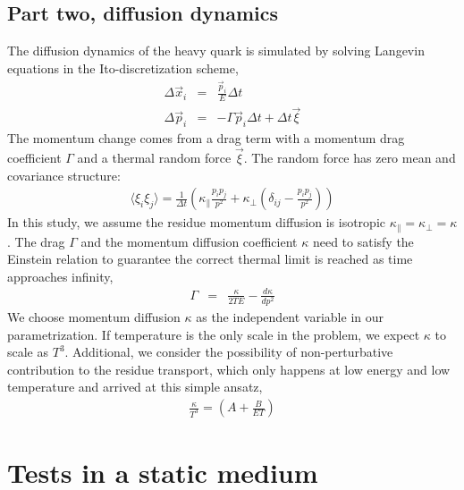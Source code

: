\documentclass[aps, prc, reprint, amsmath, groupedaddress, nofootinbib]{revtex4-1}
\newcommand{\Kpara}{\kappa_{\|}}
\newcommand{\Kperp}{\kappa_{\perp}}
\begin{document}
\subsection{Part two, diffusion dynamics}
The diffusion dynamics of the heavy quark is simulated by solving Langevin equations in the Ito-discretization scheme,
\begin{eqnarray}
\Delta \vec{x}_i &=& \frac{\vec{p}_i}{E} \Delta t	\\
\Delta \vec{p}_i &=& -\Gamma \vec{p}_i \Delta t + \Delta t \vec{\xi}
\end{eqnarray}
The momentum change comes from a drag term with a momentum drag coefficient $\Gamma$ and a thermal random force $\vec{\xi}$. 
The random force has zero mean and covariance structure:
\begin{eqnarray}
\langle \xi_i \xi_j \rangle = \frac{1}{\Delta t}\left(\Kpara \frac{p_i p_j}{p^2} + \Kperp \left(\delta_{ij} - \frac{p_i p_j}{p^2}\right) \right)
\end{eqnarray}
In this study, we assume the residue momentum diffusion is isotropic $\Kpara=\Kperp=\kappa$.
The drag $\Gamma$ and the momentum diffusion coefficient $\kappa$ need to satisfy the Einstein relation to guarantee the correct thermal limit is reached as time approaches infinity,
\begin{eqnarray}
\Gamma &=& \frac{\kappa}{2TE} - \frac{d\kappa}{dp^2}
\end{eqnarray}
We choose momentum diffusion $\kappa$ as the independent variable in our parametrization.
If temperature is the only scale in the problem, we expect $\kappa$ to scale as $T^3$.
Additional, we consider the possibility of non-perturbative contribution to the residue transport, which only happens at low energy and low temperature and arrived at this simple ansatz,
\begin{eqnarray}
\frac{\kappa}{T^3} = \left(A + \frac{B}{ET}\right)
\end{eqnarray}

\section{Tests in a static medium}
\end{document}

